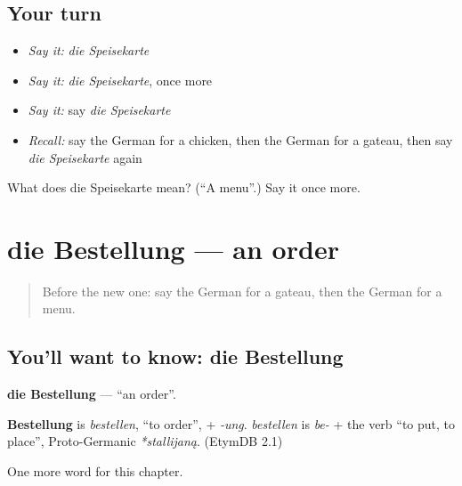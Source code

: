 \subsection*{Your turn}
\begin{itemize}
\raggedright
  \item \emph{Say it:} \emph{die Speisekarte}
  \item \emph{Say it:} \emph{die Speisekarte}, once more
  \item \emph{Say it:} say \emph{die Speisekarte}
  \item \emph{Recall:} say the German for a chicken, then the German for a gateau, then say \emph{die Speisekarte} again
\end{itemize}

\begin{tcolorbox}[breakable,colback=teal!4,colframe=teal!35!black,title={Before you move on}]
What does die Speisekarte mean? (\textquotedblleft{}A menu\textquotedblright{}.) Say it once more.
\end{tcolorbox}
\section[die Bestellung]{die Bestellung — an order}

\label{lesson:GE-C200-bestellung}



\begin{quote}
Before the new one: say the German for a gateau, then the German for a menu.
\end{quote}

\subsection*{You'll want to know: die Bestellung}
\textbf{die Bestellung} — \textquotedblleft{}an order\textquotedblright{}.

\begin{cousinweb}
\textbf{Bestellung} is \emph{bestellen}, \textquotedblleft{}to order\textquotedblright{}, + \emph{-ung}. \emph{bestellen} is \emph{be-} + the verb \textquotedblleft{}to put, to place\textquotedblright{}, Proto-Germanic \emph{*stallijaną}. (EtymDB 2.1)
\end{cousinweb}

\begin{grammarlens}[title={What you've built}]
One more word for this chapter.
\end{grammarlens}

